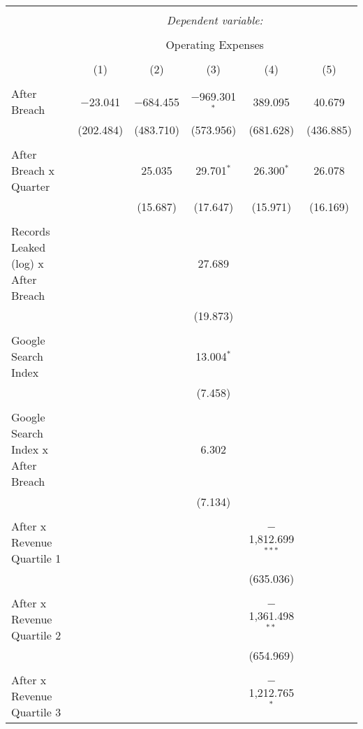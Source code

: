 
\begin{table}[!htbp] \centering 
  \caption{} 
  \label{} 
\begin{tabular}{@{\extracolsep{5pt}}lccccc} 
\\[-1.8ex]\hline 
\hline \\[-1.8ex] 
 & \multicolumn{5}{c}{\textit{Dependent variable:}} \\ 
\cline{2-6} 
\\[-1.8ex] & \multicolumn{5}{c}{Operating Expenses} \\ 
\\[-1.8ex] & (1) & (2) & (3) & (4) & (5)\\ 
\hline \\[-1.8ex] 
 After Breach & $-$23.041 & $-$684.455 & $-$969.301$^{*}$ & 389.095 & 40.679 \\ 
  & (202.484) & (483.710) & (573.956) & (681.628) & (436.885) \\ 
  & & & & & \\ 
 After Breach x Quarter &  & 25.035 & 29.701$^{*}$ & 26.300$^{*}$ & 26.078 \\ 
  &  & (15.687) & (17.647) & (15.971) & (16.169) \\ 
  & & & & & \\ 
 Records Leaked (log) x After Breach &  &  & 27.689 &  &  \\ 
  &  &  & (19.873) &  &  \\ 
  & & & & & \\ 
 Google Search Index &  &  & 13.004$^{*}$ &  &  \\ 
  &  &  & (7.458) &  &  \\ 
  & & & & & \\ 
 Google Search Index x After Breach &  &  & 6.302 &  &  \\ 
  &  &  & (7.134) &  &  \\ 
  & & & & & \\ 
 After x Revenue Quartile 1 &  &  &  & $-$1,812.699$^{***}$ &  \\ 
  &  &  &  & (635.036) &  \\ 
  & & & & & \\ 
 After x Revenue Quartile 2 &  &  &  & $-$1,361.498$^{**}$ &  \\ 
  &  &  &  & (654.969) &  \\ 
  & & & & & \\ 
 After x Revenue Quartile 3 &  &  &  & $-$1,212.765$^{*}$ &  \\ 

\end{tabular}
\end{table}

